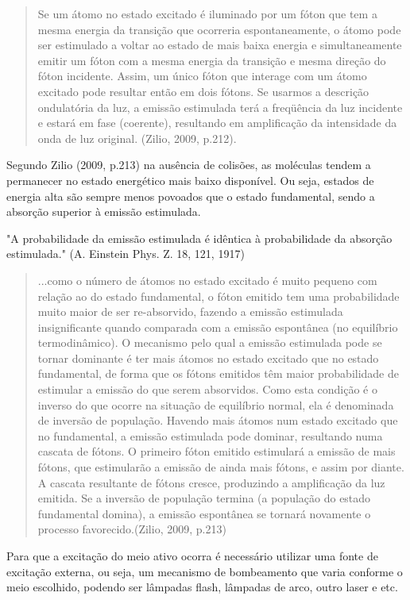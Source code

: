 \documentclass{fei}
\begin{document}
\begin{quote}
Se um átomo no estado excitado é iluminado por um fóton que tem a mesma energia da transição que ocorreria espontaneamente, o átomo pode ser estimulado a voltar ao estado de mais baixa energia e simultaneamente emitir um fóton com a mesma energia da transição e mesma direção do fóton incidente. Assim, um único fóton que interage com um átomo excitado pode resultar então em dois fótons. Se usarmos a descrição ondulatória da luz, a emissão estimulada terá a freqüência da luz incidente e estará em fase (coerente), resultando em amplificação da intensidade da onda de luz original. (Zilio, 2009, p.212).
\end{quote}

Segundo Zilio (2009, p.213) na ausência de colisões, as moléculas tendem a permanecer no estado energético mais baixo disponível. Ou seja, estados de energia alta são sempre menos povoados que o estado fundamental, sendo a absorção superior à emissão estimulada.

"A probabilidade da emissão estimulada é idêntica à probabilidade da absorção estimulada." (A. Einstein Phys. Z. 18, 121, 1917)

\begin{quote}
...como o número de átomos no estado excitado é muito pequeno com relação ao do estado fundamental, o fóton emitido tem uma probabilidade muito maior de ser re-absorvido, fazendo a emissão estimulada insignificante quando comparada com a emissão espontânea (no equilíbrio termodinâmico). O mecanismo pelo qual a emissão estimulada pode se tornar dominante é ter mais átomos no estado excitado que no estado fundamental, de forma que os fótons emitidos têm maior probabilidade de estimular a emissão do que serem absorvidos. Como esta condição é o inverso do que ocorre na situação de equilíbrio normal, ela é denominada de inversão de população. Havendo mais átomos num estado excitado que no fundamental, a emissão estimulada pode dominar, resultando numa cascata de fótons. O primeiro fóton emitido estimulará a emissão de mais fótons, que estimularão a emissão de ainda mais fótons, e assim por diante. A cascata resultante de fótons cresce, produzindo a amplificação da luz emitida. Se a inversão de população termina (a população do estado fundamental domina), a emissão espontânea se tornará novamente o processo favorecido.(Zilio, 2009, p.213)
\end{quote}

Para que a excitação do meio ativo ocorra é necessário utilizar uma fonte de excitação externa, ou seja, um mecanismo de bombeamento que varia conforme o meio escolhido, podendo ser lâmpadas flash, lâmpadas de arco, outro laser e etc.
\end{document}

